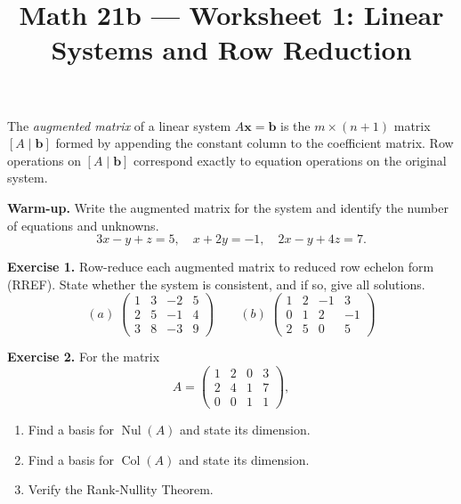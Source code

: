\documentclass{amsart}
\title{Math 21b --- Worksheet 1: Linear Systems and Row Reduction}
\date{}
\newcommand{\Nul}{\operatorname{Nul}}
\newcommand{\Col}{\operatorname{Col}}
\begin{document}
\maketitle

\begin{defn}
The \emph{augmented matrix} of a linear system $A\mathbf{x} = \mathbf{b}$ is the $m \times (n+1)$ matrix $[A \mid \mathbf{b}]$ formed by appending the constant column to the coefficient matrix. Row operations on $[A \mid \mathbf{b}]$ correspond exactly to equation operations on the original system.
\end{defn}

\vspace{1em}

\textbf{Warm-up.} Write the augmented matrix for the system and identify the number of equations and unknowns.
\[
3x - y + z = 5,\quad x + 2y = -1,\quad 2x - y + 4z = 7.
\]
\begin{work}
\end{work}

\vspace{2em}

\textbf{Exercise 1.} Row-reduce each augmented matrix to reduced row echelon form (RREF). State whether the system is consistent, and if so, give all solutions.
\[
(a)\;\begin{pmatrix}1&3&-2&5\\2&5&-1&4\\3&8&-3&9\end{pmatrix}
\qquad
(b)\;\begin{pmatrix}1&2&-1&3\\0&1&2&-1\\2&5&0&5\end{pmatrix}
\]
\begin{work}
\end{work}

\vspace{2em}

\textbf{Exercise 2.} For the matrix
\[
A = \begin{pmatrix}1&2&0&3\\2&4&1&7\\0&0&1&1\end{pmatrix},
\]
\begin{enumerate}
    \item[(a)] Find a basis for $\Nul(A)$ and state its dimension.
    \item[(b)] Find a basis for $\Col(A)$ and state its dimension.
    \item[(c)] Verify the Rank-Nullity Theorem.
\end{enumerate}
\begin{work}
\end{work}
\end{document}
